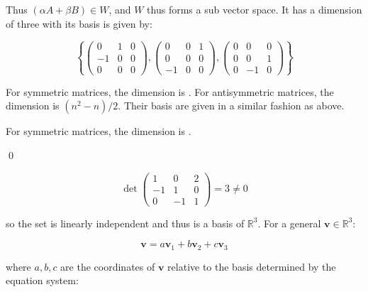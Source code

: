\documentclass[12pt]{article}
\begin{document}
Thus $(\alpha A + \beta B) \in W$, and $W$ thus forms a sub vector space. It has a dimension of three with its basis is given by:

\begin{equation}
    \left\{
    \begin{pmatrix}
        0  & 1 & 0 \\
        -1 & 0 & 0 \\
        0  & 0 & 0
    \end{pmatrix},
    \begin{pmatrix}
        0  & 0 & 1 \\
        0  & 0 & 0 \\
        -1 & 0 & 0
    \end{pmatrix},
    \begin{pmatrix}
        0 & 0  & 0 \\
        0 & 0  & 1 \\
        0 & -1 & 0
    \end{pmatrix}
    \right\}
\end{equation}

For symmetric matrices, the dimension is . For antisymmetric matrices, the dimension is $(n^{2} - n)/2$. Their basis are given in a similar fashion as above.

\begin{correction}
    For symmetric matrices, the dimension is .
\end{correction}
\qed



\begin{equation}
    \det{\begin{pmatrix}
            1  & 0  & 2 \\
            -1 & 1  & 0 \\
            0  & -1 & 1
        \end{pmatrix}} = 3 \ne 0
\end{equation}

so the set is linearly independent and thus is a basis of $\mathbb{R}^{3}$. For a general $\mathbf{v} \in \mathbb{R}^{3}$:

\begin{equation}
    \mathbf{v} = a \mathbf{v}_{1} + b \mathbf{v}_{2} + c \mathbf{v}_{3}
\end{equation}

where $a, b, c$ are the coordinates of $\mathbf{v}$ relative to the basis determined by the equation system:
\end{document}
